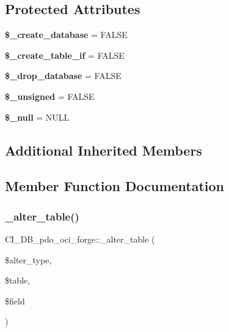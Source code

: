 \subsection*{Protected Attributes}
\begin{DoxyCompactItemize}
\item 
\mbox{\label{class_c_i___d_b__pdo__oci__forge_a3ec8da890b35cc54b7d7ba06a6b838a2}} 
{\bfseries \$\+\_\+create\+\_\+database} = F\+A\+L\+SE
\item 
\mbox{\label{class_c_i___d_b__pdo__oci__forge_a1358ea8d9d411eaf1292758da1886ec1}} 
{\bfseries \$\+\_\+create\+\_\+table\+\_\+if} = F\+A\+L\+SE
\item 
\mbox{\label{class_c_i___d_b__pdo__oci__forge_a046fdb4df6b651cb9416922e583e798f}} 
{\bfseries \$\+\_\+drop\+\_\+database} = F\+A\+L\+SE
\item 
\mbox{\label{class_c_i___d_b__pdo__oci__forge_a029ff4f1bebfdc54854b9aedb37713e3}} 
{\bfseries \$\+\_\+unsigned} = F\+A\+L\+SE
\item 
\mbox{\label{class_c_i___d_b__pdo__oci__forge_af9b3aa0a6213738da72a28cecd84dccf}} 
{\bfseries \$\+\_\+null} = \textquotesingle{}N\+U\+LL\textquotesingle{}
\end{DoxyCompactItemize}
\subsection*{Additional Inherited Members}


\subsection{Member Function Documentation}
\mbox{\label{class_c_i___d_b__pdo__oci__forge_ad4f3a1c5f262126d12974997bd219e2a}} 
\subsubsection{\texorpdfstring{\+\_\+alter\+\_\+table()}{\_alter\_table()}}
{\footnotesize\ttfamily C\+I\+\_\+\+D\+B\+\_\+pdo\+\_\+oci\+\_\+forge\+::\+\_\+alter\+\_\+table (\begin{DoxyParamCaption}\item[{}]{\$alter\+\_\+type,  }\item[{}]{\$table,  }\item[{}]{\$field }\end{DoxyParamCaption})\hspace{0.3cm}{\ttfamily [protected]}}

